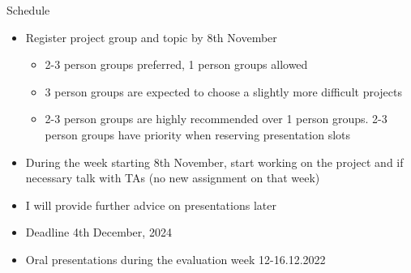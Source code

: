 \documentclass[t]{beamer}
\begin{document}
\begin{frame}
  
  {\Large\color{navyblue} Schedule}


  \begin{itemize}
  \item Register project group and topic by 8th November
    \begin{itemize}
    \item 2-3 person groups preferred, 1 person groups allowed
    \item 3 person groups are expected to choose a slightly more difficult projects
	\item 2-3 person groups are highly recommended over 1 person groups. 2-3 person groups have priority when reserving presentation slots
    \end{itemize}
  \item During the week starting 8th November, start working on the
    project and if necessary talk with TAs (no new assignment on that
    week)
  \item I will provide further advice on presentations later
  \item Deadline 4th December, 2024
  \item Oral presentations during the evaluation week 12-16.12.2022
  \end{itemize}
  
\end{frame}
\end{document}

